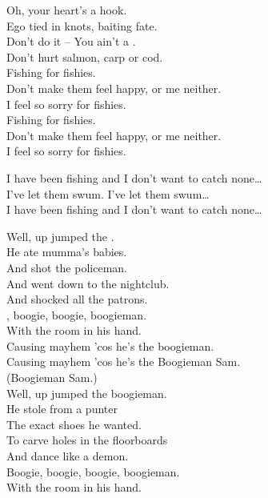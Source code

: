 
Oh, your heart's a hook. \\
Ego tied in knots, baiting fate. \\
Don't do it -- You ain't a . \\
Don't hurt salmon, carp or cod. \\

Fishing for fishies. \\
Don't make them feel happy, or me neither. \\
I feel so sorry for fishies. \\
Fishing for fishies. \\
Don't make them feel happy, or me neither. \\
I feel so sorry for fishies. \\


I have been fishing and I don't want to catch none… \\
I've let them swum. I've let them swum… \\

I have been fishing and I don't want to catch none… \\





Well, up jumped the . \\
He ate mumma's babies. \\
And shot the policeman. \\
And went down to the nightclub. \\
And shocked all the patrons. \\
, boogie, boogie, boogieman. \\
With the room in his hand. \\

Causing mayhem 'cos he's the boogieman. \\
Causing mayhem 'cos he's the Boogieman Sam. \\
(Boogieman Sam.) \\

Well, up jumped the boogieman. \\
He stole from a punter \\
The exact shoes he wanted. \\
To carve holes in the floorboards \\
And dance like a demon. \\
Boogie, boogie, boogie, boogieman. \\
With the room in his hand. \\

